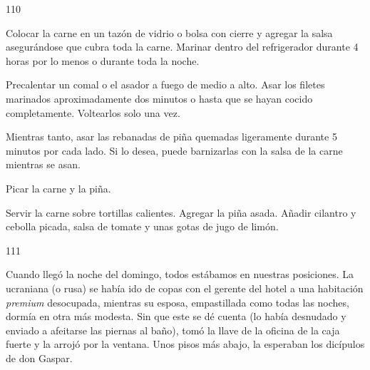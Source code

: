 \documentclass[12pt,twoside,openright,a5paper]{book}
\begin{document}
\vspace{0.5cm}

\hrulefill \hspace{0.1cm}\decofourleft\hspace{0.2cm} 110 \hspace{0.2cm}\decofourright \hspace{0.1cm}\hrulefill

\nopagebreak

\vspace{0.5cm}

\nopagebreak

Colocar la carne en un tazón de vidrio o bolsa con cierre y agregar la
salsa asegurándose que cubra toda la carne. Marinar dentro del refrigerador
durante 4 horas por lo menos o durante toda la noche.

Precalentar un comal o el asador a fuego de medio a alto. Asar los filetes
marinados aproximadamente dos minutos
o hasta que se hayan cocido completamente.
Voltearlos solo una vez.

Mientras tanto, asar las rebanadas de piña quemadas ligeramente
durante 5 minutos por cada lado. Si lo desea, puede barnizarlas con la
salsa de la carne mientras se asan.

Picar la carne y la piña.

Servir la carne sobre tortillas calientes. Agregar la piña asada. Añadir
cilantro y cebolla picada, salsa de tomate y unas gotas de jugo de limón.

\vspace{0.5cm}

\hrulefill \hspace{0.1cm}\decofourleft\hspace{0.2cm} 111 \hspace{0.2cm}\decofourright \hspace{0.1cm}\hrulefill

\nopagebreak

\vspace{0.5cm}

\nopagebreak

Cuando llegó la noche del domingo, todos estábamos en nuestras posiciones.
La ucraniana (o rusa) se había ido de copas con el gerente del hotel
a una habitación \emph{premium} desocupada, mientras su esposa, empastillada como
todas las noches, dormía en otra más modesta. Sin que este se dé cuenta
(lo había desnudado y enviado a afeitarse las piernas al baño), tomó
la llave de la oficina de la caja fuerte y la arrojó por la ventana. Unos
pisos más abajo, la esperaban los dicípulos de don Gaspar.
\end{document}
